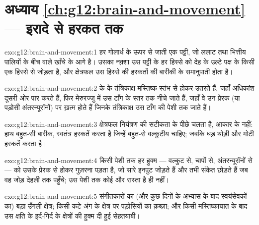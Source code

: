 \section*{अध्याय \ref{ch:g12:brain-and-movement} --- इरादे से हरकत तक}

\begin{solution}{exo:g12:brain-and-movement:1}
हर गोलार्ध के ऊपर से जाती एक पट्टी, जो ललाट तथा भित्तीय पालियों के बीच वाले
खाँचे के आगे है। उसका नक़्शा उस पट्टी के हर हिस्से को देह के उल्टे पक्ष के
किसी एक हिस्से से जोड़ता है, और क्षेत्रफल उस हिस्से की हरकतों की बारीकी के
समानुपाती होता है।
\end{solution}

\begin{solution}{exo:g12:brain-and-movement:2}
 के  के तंत्रिकाक्ष मस्तिष्क स्तंभ से होकर उतरते हैं,
जहाँ अधिकांश दूसरी ओर पार करते हैं, फिर मेरुरज्जु में उस टाँग के स्तर तक
नीचे जाते हैं, जहाँ वे उन प्रेरक  (या पड़ोसी अंतरन्यूरॉनों) पर
ख़त्म होते हैं जिनके तंत्रिकाक्ष उस टाँग की पेशी तक जाते हैं।
\end{solution}

\begin{solution}{exo:g12:brain-and-movement:3}
क्षेत्रफल नियंत्रण की सटीकता के पीछे चलता है, आकार के नहीं: हाथ बहुत-सी
बारीक, स्वतंत्र हरकतें करता है जिन्हें बहुत-से वल्कुटीय  चाहिए; जबकि
धड़ थोड़ी और मोटी हरकतें करता है।
\end{solution}

\begin{solution}{exo:g12:brain-and-movement:4}
किसी पेशी तक हर हुक्म --- वल्कुट से,  चापों से, अंतरन्यूरॉनों से
--- को उसके प्रेरक  से होकर गुज़रना पड़ता है, जो सारे इनपुट जोड़ते
हैं और तभी संकेत छोड़ते हैं जब वह जोड़ देहली तक पहुँचे; उस पेशी तक कोई और
रास्ता है ही नहीं।
\end{solution}

\begin{solution}{exo:g12:brain-and-movement:5}
संगीतकारों का (और कुछ दिनों के अभ्यास के बाद स्वयंसेवकों का) बड़ा उँगली
क्षेत्र; किसी कटे अंग के क्षेत्र पर पड़ोसियों का क़ब्ज़ा; और किसी
मस्तिष्काघात के बाद उस क्षति के इर्द-गिर्द के क्षेत्रों की हुक्म दी हुई
सेहतयाबी।
\end{solution}

